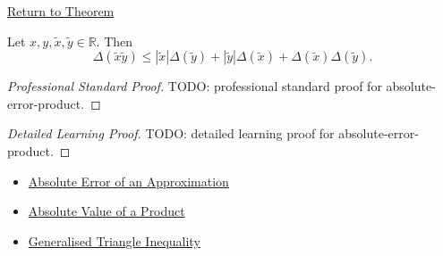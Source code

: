\newpage
{}
\label{prf:absolute-error-product}

\begin{remark*}[Return]
\hyperref[thm:absolute-error-product]{Return to Theorem}
\end{remark*}

\begin{theorem*}
Let $x,y,\widetilde{x},\widetilde{y}\in\mathbb{R}$. Then
\[
  \Delta(\widetilde{x}\widetilde{y})
  \leq
  |\widetilde{x}|\Delta(\widetilde{y})
  +
  |\widetilde{y}|\Delta(\widetilde{x})
  +
  \Delta(\widetilde{x})\Delta(\widetilde{y}).
\]
\end{theorem*}

\begin{proof}[Professional Standard Proof]
\LRAProofBodyStart
TODO: professional standard proof for absolute-error-product.
\end{proof}

\begin{proof}[Detailed Learning Proof]
\LRAProofBodyStart
TODO: detailed learning proof for absolute-error-product.
\end{proof}

\begin{remark*}
\end{remark*}

\begin{dependencies}
\begin{itemize}
  \item \hyperref[def:absolute-error-approximation]{Absolute Error of an Approximation}
  \item \hyperref[thm:absolute-value-product]{Absolute Value of a Product}
  \item \hyperref[thm:absolute-value-sum-bound]{Generalised Triangle Inequality}
\end{itemize}
\end{dependencies}

\clearpage
